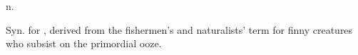  n.

Syn. for , derived from the fishermen's and naturalists'
term for finny creatures who subsist on the primordial ooze.

